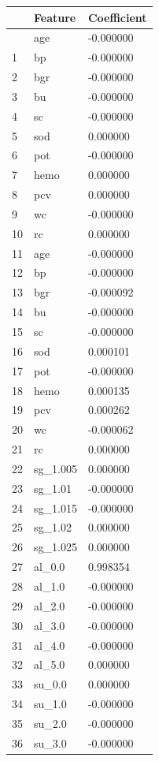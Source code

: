 \documentclass[
  11pt,
  letterpaper,
  DIV=11,
  numbers=noendperiod]{scrartcl}
\begin{document}
\begin{longtable}[]{@{}lll@{}}
\toprule\noalign{}
& Feature & Coefficient \\
\midrule\noalign{}
\endhead
\bottomrule\noalign{}
\endlastfoot
0 & age & -0.000000 \\
1 & bp & -0.000000 \\
2 & bgr & -0.000000 \\
3 & bu & -0.000000 \\
4 & sc & -0.000000 \\
5 & sod & 0.000000 \\
6 & pot & -0.000000 \\
7 & hemo & 0.000000 \\
8 & pcv & 0.000000 \\
9 & wc & -0.000000 \\
10 & rc & 0.000000 \\
11 & age & -0.000000 \\
12 & bp & -0.000000 \\
13 & bgr & -0.000092 \\
14 & bu & -0.000000 \\
15 & sc & -0.000000 \\
16 & sod & 0.000101 \\
17 & pot & -0.000000 \\
18 & hemo & 0.000135 \\
19 & pcv & 0.000262 \\
20 & wc & -0.000062 \\
21 & rc & 0.000000 \\
22 & sg\_1.005 & 0.000000 \\
23 & sg\_1.01 & -0.000000 \\
24 & sg\_1.015 & -0.000000 \\
25 & sg\_1.02 & 0.000000 \\
26 & sg\_1.025 & 0.000000 \\
27 & al\_0.0 & 0.998354 \\
28 & al\_1.0 & -0.000000 \\
29 & al\_2.0 & -0.000000 \\
30 & al\_3.0 & -0.000000 \\
31 & al\_4.0 & -0.000000 \\
32 & al\_5.0 & 0.000000 \\
33 & su\_0.0 & 0.000000 \\
34 & su\_1.0 & -0.000000 \\
35 & su\_2.0 & -0.000000 \\
36 & su\_3.0 & -0.000000 \\

\end{longtable}
\end{document}
